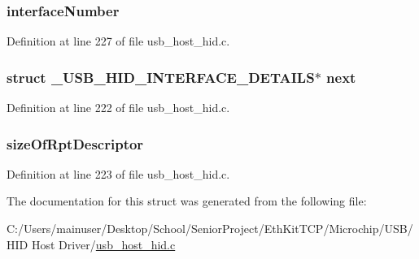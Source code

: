 \subsubsection[{interface\+Number}]{ interface\+Number}\label{struct___u_s_b___h_i_d___i_n_t_e_r_f_a_c_e___d_e_t_a_i_l_s_ab1e86a4ed2aed02a538fa15d50470ad7}


Definition at line 227 of file usb\+\_\+host\+\_\+hid.\+c.

\hypertarget{struct___u_s_b___h_i_d___i_n_t_e_r_f_a_c_e___d_e_t_a_i_l_s_a23a3ff536a3ae02b8aac03f48803dc54}{}
\subsubsection[{next}]{\setlength{\rightskip}{0pt plus 5cm}struct {\bf \+\_\+\+U\+S\+B\+\_\+\+H\+I\+D\+\_\+\+I\+N\+T\+E\+R\+F\+A\+C\+E\+\_\+\+D\+E\+T\+A\+I\+L\+S}$\ast$ next}\label{struct___u_s_b___h_i_d___i_n_t_e_r_f_a_c_e___d_e_t_a_i_l_s_a23a3ff536a3ae02b8aac03f48803dc54}


Definition at line 222 of file usb\+\_\+host\+\_\+hid.\+c.

\hypertarget{struct___u_s_b___h_i_d___i_n_t_e_r_f_a_c_e___d_e_t_a_i_l_s_a2b18732fddc09ad61db730b3029fc0c0}{}
\subsubsection[{size\+Of\+Rpt\+Descriptor}]{ size\+Of\+Rpt\+Descriptor}\label{struct___u_s_b___h_i_d___i_n_t_e_r_f_a_c_e___d_e_t_a_i_l_s_a2b18732fddc09ad61db730b3029fc0c0}


Definition at line 223 of file usb\+\_\+host\+\_\+hid.\+c.



The documentation for this struct was generated from the following file\+:\begin{DoxyCompactItemize}
\item 
C\+:/\+Users/mainuser/\+Desktop/\+School/\+Senior\+Project/\+Eth\+Kit\+T\+C\+P/\+Microchip/\+U\+S\+B/\+H\+I\+D Host Driver/\hyperlink{usb__host__hid_8c}{usb\+\_\+host\+\_\+hid.\+c}\end{DoxyCompactItemize}
